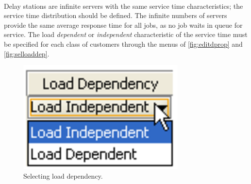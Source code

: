 \\ Delay stations are infinite
servers with the same service time characteristics; the service
time distribution should be defined. The infinite numbers of
servers provide the same  average response time for all jobs, as
no job waits in queue for service. The load \emph{dependent} or
\emph{independent} characteristic of the service time must be
specified for each class of customers through the menus of
\autoref{fig:editdprop} and \autoref{fig:selloaddep}.
\begin{figure}[htb]
    \begin{center}
        \includegraphics[scale=.5]{img/jsimg/8.16.eps}
    \end{center}
    \caption{Selecting load dependency.}
    \label{fig:selloaddep}
\end{figure}

